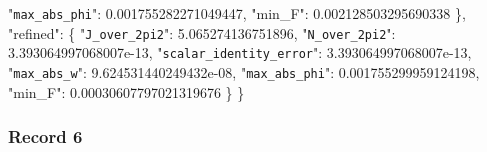 \documentclass[
  10pt,
]{article}
\newenvironment{Shaded}{}{}
\newcommand{\DataTypeTok}[1]{\textcolor[rgb]{0.56,0.13,0.00}{#1}}
\newcommand{\FloatTok}[1]{\textcolor[rgb]{0.25,0.63,0.44}{#1}}
\newcommand{\FunctionTok}[1]{\textcolor[rgb]{0.02,0.16,0.49}{#1}}
\begin{document}
\begin{Shaded}
\begin{Highlighting}[]
    \DataTypeTok{"\nolinkurl{max_abs_phi}"}\FunctionTok{:} \FloatTok{0.001755282271049447}\FunctionTok{,}
    \DataTypeTok{"min\_F"}\FunctionTok{:} \FloatTok{0.002128503295690338}
  \FunctionTok{\},}
  \DataTypeTok{"refined"}\FunctionTok{:} \FunctionTok{\{}
    \DataTypeTok{"\nolinkurl{J_over_2pi2}"}\FunctionTok{:} \FloatTok{5.065274136751896}\FunctionTok{,}
    \DataTypeTok{"\nolinkurl{N_over_2pi2}"}\FunctionTok{:} \FloatTok{3.393064997068007e{-}13}\FunctionTok{,}
    \DataTypeTok{"\nolinkurl{scalar_identity_error}"}\FunctionTok{:} \FloatTok{3.393064997068007e{-}13}\FunctionTok{,}
    \DataTypeTok{"\nolinkurl{max_abs_w}"}\FunctionTok{:} \FloatTok{9.624531440249432e{-}08}\FunctionTok{,}
    \DataTypeTok{"\nolinkurl{max_abs_phi}"}\FunctionTok{:} \FloatTok{0.001755299959124198}\FunctionTok{,}
    \DataTypeTok{"min\_F"}\FunctionTok{:} \FloatTok{0.00030607797021319676}
  \FunctionTok{\}}
\FunctionTok{\}}
\end{Highlighting}
\end{Shaded}

\hypertarget{record-6-2}{%
\subsubsection{Record 6}\label{record-6-2}}
\end{document}
